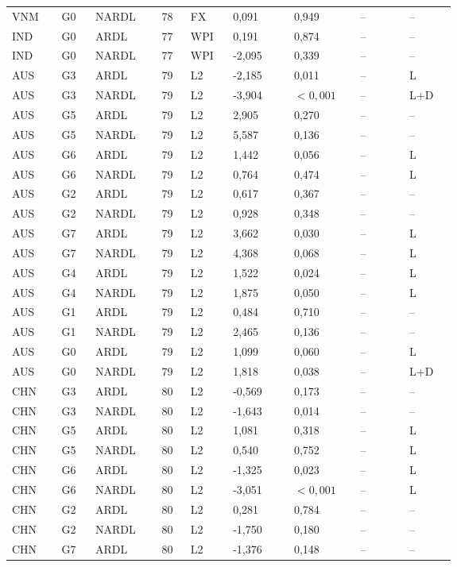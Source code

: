 {\begin{longtable}{p{0.075\linewidth}p{0.05\linewidth}p{0.09\linewidth}p{0.04\linewidth}p{0.05\linewidth}p{0.1\linewidth}p{0.085\linewidth}p{0.085\linewidth}p{0.075\linewidth}}
VNM & G0 & NARDL & 78 & FX & 0,091 & 0,949 & -- & --\\
IND & G0 & ARDL & 77 & WPI & 0,191 & 0,874 & -- & --\\
IND & G0 & NARDL & 77 & WPI & -2,095 & 0,339 & -- & --\\
AUS & G3 & ARDL & 79 & L2 & -2,185 & 0,011 & -- & L\\
AUS & G3 & NARDL & 79 & L2 & -3,904 & \(<0{,}001\) & -- & L+D\\
AUS & G5 & ARDL & 79 & L2 & 2,905 & 0,270 & -- & --\\
AUS & G5 & NARDL & 79 & L2 & 5,587 & 0,136 & -- & --\\
AUS & G6 & ARDL & 79 & L2 & 1,442 & 0,056 & -- & L\\
AUS & G6 & NARDL & 79 & L2 & 0,764 & 0,474 & -- & L\\
AUS & G2 & ARDL & 79 & L2 & 0,617 & 0,367 & -- & --\\
AUS & G2 & NARDL & 79 & L2 & 0,928 & 0,348 & -- & --\\
AUS & G7 & ARDL & 79 & L2 & 3,662 & 0,030 & -- & L\\
AUS & G7 & NARDL & 79 & L2 & 4,368 & 0,068 & -- & L\\
AUS & G4 & ARDL & 79 & L2 & 1,522 & 0,024 & -- & L\\
AUS & G4 & NARDL & 79 & L2 & 1,875 & 0,050 & -- & L\\
AUS & G1 & ARDL & 79 & L2 & 0,484 & 0,710 & -- & --\\
AUS & G1 & NARDL & 79 & L2 & 2,465 & 0,136 & -- & --\\
AUS & G0 & ARDL & 79 & L2 & 1,099 & 0,060 & -- & L\\
AUS & G0 & NARDL & 79 & L2 & 1,818 & 0,038 & -- & L+D\\
CHN & G3 & ARDL & 80 & L2 & -0,569 & 0,173 & -- & --\\
CHN & G3 & NARDL & 80 & L2 & -1,643 & 0,014 & -- & --\\
CHN & G5 & ARDL & 80 & L2 & 1,081 & 0,318 & -- & L\\
CHN & G5 & NARDL & 80 & L2 & 0,540 & 0,752 & -- & L\\
CHN & G6 & ARDL & 80 & L2 & -1,325 & 0,023 & -- & L\\
CHN & G6 & NARDL & 80 & L2 & -3,051 & \(<0{,}001\) & -- & L\\
CHN & G2 & ARDL & 80 & L2 & 0,281 & 0,784 & -- & --\\
CHN & G2 & NARDL & 80 & L2 & -1,750 & 0,180 & -- & --\\
CHN & G7 & ARDL & 80 & L2 & -1,376 & 0,148 & -- & --\\

\end{longtable}}
